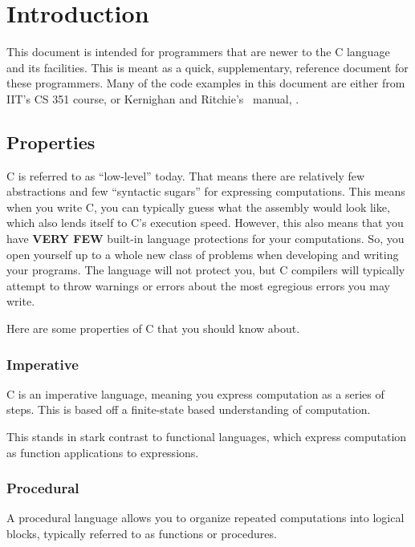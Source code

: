 \section{Introduction}\label{sec:Intro}
This document is intended for programmers that are newer to the C language and its facilities.
This is meant as a quick, supplementary, reference document for these programmers.
Many of the code examples in this document are either from IIT's CS 351 course, or Kernighan and Ritchie's~\cite{KernighanRitchieCProg} manual, .

\subsection{Properties}\label{subsec:Properties}
C is referred to as ``low-level'' today.
That means there are relatively few abstractions and few ``syntactic sugars'' for expressing computations.
This means when you write C, you can typically guess what the assembly would look like, which also lends itself to C's execution speed.
However, this also means that you have \textbf{VERY FEW} built-in language protections for your computations.
So, you open yourself up to a whole new class of problems when developing and writing your programs.
The language will not protect you, but C compilers will typically attempt to throw warnings or errors about the most egregious errors you may write.

Here are some properties of C that you should know about.

\subsubsection{Imperative}\label{subsubsec:Imperative}
C is an imperative language, meaning you express computation as a series of steps.
This is based off a finite-state based understanding of computation.

This stands in stark contrast to functional languages, which express computation as function applications to expressions.

\subsubsection{Procedural}\label{subsubsec:Procedural}
A procedural language allows you to organize repeated computations into logical blocks, typically referred to as functions or procedures.


